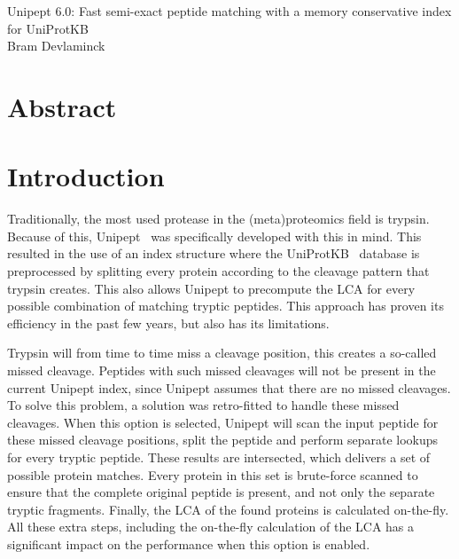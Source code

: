 \documentclass[10pt]{article}
\begin{document}
    \begingroup
    \centering
    \LARGE Unipept 6.0: Fast semi-exact peptide matching with a memory conservative index for UniProtKB\\[1em]
    \large Bram Devlaminck\\[2em]
    \endgroup

    \begin{multicols}{2}
        \section*{Abstract}\label{sec:test-section}


        \section{Introduction}\label{sec:introduction}
        Traditionally, the most used protease in the (meta)proteomics field is trypsin.
        Because of this, Unipept~\cite{unipept_desktop, unipept_api, unipept_4, unipept_orig, unipept_tutorial, unipept_web, unipept_cli, unipept_desktop_2} was specifically developed with this in mind.
        This resulted in the use of an index structure where the UniProtKB~\cite{UniprotKB} database is preprocessed by splitting every protein according to the cleavage pattern that trypsin creates.
        This also allows Unipept to precompute the LCA for every possible combination of matching tryptic peptides.
        This approach has proven its efficiency in the past few years, but also has its limitations.

        Trypsin will from time to time miss a cleavage position, this creates a so-called missed cleavage.
        Peptides with such missed cleavages will not be present in the current Unipept index, since Unipept assumes that there are no missed cleavages.
        To solve this problem, a solution was retro-fitted to handle these missed cleavages.
        When this option is selected, Unipept will scan the input peptide for these missed cleavage positions, split the peptide and perform separate lookups for every tryptic peptide.
        These results are intersected, which delivers a set of possible protein matches.
         Every protein in this set is brute-force scanned to ensure that the complete original peptide is present, and not only the separate tryptic fragments.
        Finally, the LCA of the found proteins is calculated on-the-fly.
        All these extra steps, including the on-the-fly calculation of the LCA has a significant impact on the performance when this option is enabled.


\end{multicols}
\end{document}
